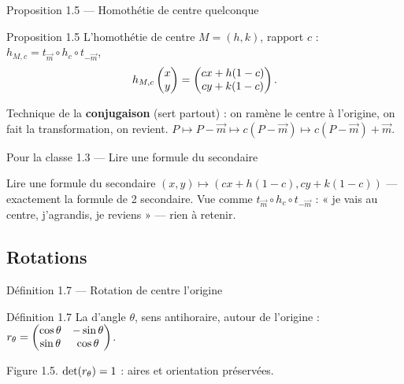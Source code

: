 \begin{frame}{Proposition 1.5 --- Homothétie de centre quelconque}
  \begin{Enonce}{Proposition 1.5}
    L'homothétie de centre $M=(h,k)$, rapport $c$ :
    $h_{M,c} = t_{\vec m}\circ h_c \circ t_{-\vec m}$,
    \[
      h_{M,c}\begin{pmatrix}x\\ y\end{pmatrix} = \begin{pmatrix}cx+h(1-c)\\ cy+k(1-c)\end{pmatrix}.
    \]
  \end{Enonce}
  \begin{AuTableau}
    \small Technique de la \textbf{conjugaison} (sert partout) : on
    ramène le centre à l'origine, on fait la transformation, on
    revient. $P\mapsto P-\vec m\mapsto c(P-\vec m)\mapsto c(P-\vec
    m)+\vec m$.
  \end{AuTableau}
\end{frame}

\begin{frame}{Pour la classe 1.3 --- Lire une formule du secondaire}
  \begin{Classe}{Lire une formule du secondaire}
    \small $(x,y)\mapsto(cx+h(1-c), cy+k(1-c))$ --- exactement la
    formule de 2 secondaire. Vue comme
    $t_{\vec m}\circ h_c\circ t_{-\vec m}$ : « je vais au centre,
    j'agrandis, je reviens » --- rien à retenir.
  \end{Classe}
\end{frame}

\subsection{Rotations}
\begin{frame}{Définition 1.7 --- Rotation de centre l'origine}
  \begin{Enonce}{Définition 1.7}
    La  d'angle $\theta$, sens antihoraire, autour de
    l'origine :
    $r_\theta = \begin{pmatrix}\cos\theta & -\sin\theta\\ \sin\theta & \cos\theta\end{pmatrix}$.
  \end{Enonce}
  \begin{center}\small Figure 1.5. $\operatorname{det}(r_\theta)=1$ : aires et
    orientation préservées.\end{center}
\end{frame}

